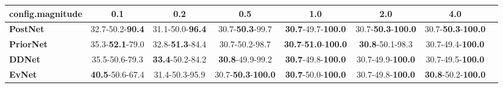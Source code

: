 \begin{tabular}{lccccccc}
\toprule
\textbf{config.magnitude} &                      0.1 &                      0.2 &                                0.5 &                                         1.0 &                                2.0 &                                4.0 \\
\midrule
\textbf{PostNet } &  32.7-50.2-\textbf{90.4} &  31.1-50.0-\textbf{96.4} &            30.7-\textbf{50.3}-99.7 &           \textbf{30.7}-49.7-\textbf{100.0} &  30.7-\textbf{50.3}-\textbf{100.0} &  30.7-\textbf{50.3}-\textbf{100.0} \\
\textbf{PriorNet} &  35.3-\textbf{52.1}-79.0 &  32.8-\textbf{51.3}-84.4 &                     30.7-50.2-98.7 &  \textbf{30.7}-\textbf{51.0}-\textbf{100.0} &            \textbf{30.8}-50.1-98.3 &           30.7-49.4-\textbf{100.0} \\
\textbf{DDNet   } &           35.5-50.6-79.3 &  \textbf{33.4}-50.2-84.2 &            \textbf{30.8}-49.9-99.2 &           \textbf{30.7}-49.8-\textbf{100.0} &           30.7-49.9-\textbf{100.0} &           30.7-49.5-\textbf{100.0} \\
\textbf{EvNet   } &  \textbf{40.5}-50.6-67.4 &           31.4-50.3-95.9 &  30.7-\textbf{50.3}-\textbf{100.0} &           \textbf{30.7}-50.0-\textbf{100.0} &           30.7-49.8-\textbf{100.0} &  \textbf{30.8}-50.2-\textbf{100.0} \\
\bottomrule
\end{tabular}
